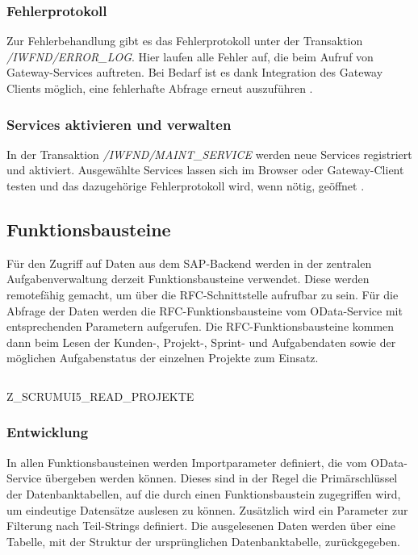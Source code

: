 \subsubsection{Fehlerprotokoll}
Zur Fehlerbehandlung gibt es das Fehlerprotokoll unter der Transaktion \emph{/IWFND/ERROR\_LOG}. Hier laufen alle Fehler auf, die beim Aufruf von Gateway-Services auftreten. Bei Bedarf ist es dank Integration des Gateway Clients möglich, eine fehlerhafte Abfrage erneut auszuführen \cite[S.\ 192-193]{BoennenDreesFischerHeinzStrothmann2014}.

\subsubsection{Services aktivieren und verwalten}
In der Transaktion \emph{/IWFND/MAINT\_SERVICE} werden neue Services registriert und aktiviert. Ausgewählte Services lassen sich im Browser oder Gateway-Client testen und das dazugehörige Fehlerprotokoll wird, wenn nötig, geöffnet \cite[S.\ 571-573]{BoennenDreesFischerHeinzStrothmann2014}.


\subsection{Funktionsbausteine}
Für den Zugriff auf Daten aus dem SAP-Backend werden in der zentralen Aufgabenverwaltung derzeit Funktionsbausteine verwendet. Diese werden remotefähig gemacht, um über die \ac{RFC}-Schnittstelle aufrufbar zu sein. Für die Abfrage der Daten werden die \ac{RFC}-Funktionsbausteine vom OData-Service mit entsprechenden Parametern aufgerufen. Die RFC-Funktionsbausteine kommen dann beim Lesen der Kunden-, Projekt-, Sprint-  und Aufgabendaten sowie der möglichen Aufgabenstatus der einzelnen Projekte zum Einsatz. 

\begin{listing}[H]
	\inputminted{abap}{src/fubaprojekte.abap}
	\caption{Z\_SCRUMUI5\_READ\_PROJEKTE}
	\label{lst:Quellcode-ReadProjekte}
\end{listing}

\subsubsection{Entwicklung}
In allen Funktionsbausteinen werden Importparameter definiert, die vom OData-Service übergeben werden können. Dieses sind in der Regel die Primärschlüssel der Datenbanktabellen, auf die durch einen Funktionsbaustein zugegriffen wird, um eindeutige Datensätze auslesen zu können. Zusätzlich wird ein Parameter zur Filterung nach Teil-Strings definiert. Die ausgelesenen Daten werden über eine Tabelle, mit der Struktur der ursprünglichen Datenbanktabelle, zurückgegeben.

